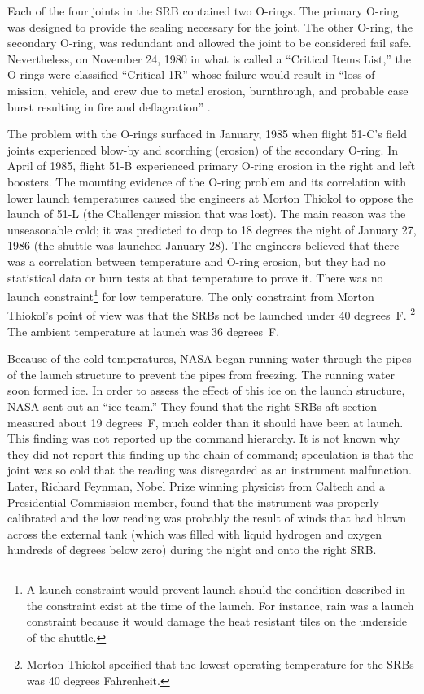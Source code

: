 Each of the four joints in the SRB contained two O-rings.
The primary O-ring was designed to provide the sealing
necessary for the joint.
The other O-ring, the secondary O-ring, was redundant and
allowed the joint to be considered fail safe.
Nevertheless, on November 24, 1980 in what is called a
``Critical Items List,'' the O-rings were classified
``Critical 1R'' whose failure would result in ``loss of
mission, vehicle, and crew due to metal erosion,
burnthrough, and probable case burst resulting in fire and
deflagration'' \cite[vol. 1, p. 239]{rogers}.

The problem with the O-rings surfaced in January, 1985 when
flight 51-C's field joints experienced blow-by and scorching
(erosion) of the secondary O-ring.
In April of 1985, flight 51-B experienced primary O-ring
erosion in the right and left boosters.
The mounting evidence of the O-ring problem and its
correlation with lower launch temperatures caused the
engineers at Morton Thiokol to oppose the launch of 51-L
(the Challenger mission that was lost).
The main reason was the unseasonable cold; it was predicted
to drop to 18 degrees the night of January 27, 1986 (the
shuttle was launched January 28).
The engineers believed that there was a correlation between
temperature and O-ring erosion, but they had no statistical
data or burn tests at that temperature to prove it.
There was no launch constraint\footnote{A launch constraint
would prevent launch should the condition described in the
constraint exist at the time of the launch.
For instance, rain was a launch constraint because it would
damage the heat resistant tiles on the underside of the
shuttle.} for low temperature.
The only constraint from Morton Thiokol's point of view was
that the SRBs not be launched under 40 degrees~F.
\footnote{Morton Thiokol specified that the lowest
operating temperature for the SRBs was 40 degrees
Fahrenheit.}
The ambient temperature at launch was 36 degrees~F.

Because of the cold temperatures, NASA began running water
through the pipes of the launch structure to prevent the
pipes from freezing.
The running water soon formed ice.
In order to assess the effect of this ice on the launch
structure, NASA sent out an ``ice team.''
They found that the right SRBs aft section measured about 19
degrees~F, much colder than it should have been at launch.
This finding was not reported up the command
hierarchy.
It is not known why they did not report this finding up the
chain of command; speculation is that the joint was so cold
that the reading was disregarded as an instrument
malfunction.
Later, Richard Feynman, Nobel Prize winning physicist from
Caltech and a Presidential Commission member, found that the
instrument was properly calibrated and the low reading was
probably the result of
winds that had blown across the
external tank (which was filled with liquid hydrogen and
oxygen hundreds of degrees below zero) during the night and onto the right
SRB.

